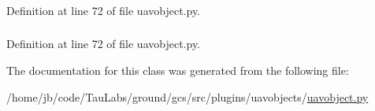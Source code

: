 \hypertarget{classuavobject_1_1_u_a_v_object_field_acc9aa14ec01184df177b6ef907073d1f}{
\subsubsection[{type}]{}}\label{classuavobject_1_1_u_a_v_object_field_acc9aa14ec01184df177b6ef907073d1f}


\-Definition at line 72 of file uavobject.\-py.

\hypertarget{classuavobject_1_1_u_a_v_object_field_a72f9d575e9fd6eaeb6842377e76ec8fe}{
\subsubsection[{values}]{}}\label{classuavobject_1_1_u_a_v_object_field_a72f9d575e9fd6eaeb6842377e76ec8fe}


\-Definition at line 72 of file uavobject.\-py.



\-The documentation for this class was generated from the following file\-:\begin{DoxyCompactItemize}
\item 
/home/jb/code/\-Tau\-Labs/ground/gcs/src/plugins/uavobjects/\hyperlink{uavobject_8py}{uavobject.\-py}\end{DoxyCompactItemize}

